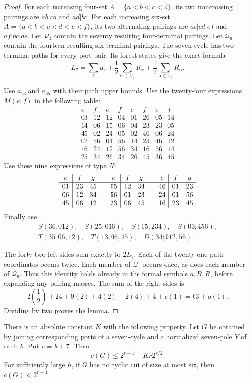 \begin{proof}
For each increasing four-set $A=\{a<b<c<d\}$, its two noncrossing pairings are $ab|cd$ and $ad|bc$.
For each increasing six-set $A=\{a<b<c<d<e<f\}$, its two alternating pairings are $ab|cd|ef$ and $af|bc|de$.
Let $\mathcal Q_4$ contain the seventy resulting four-terminal pairings.
Let $\mathcal Q_6$ contain the fourteen resulting six-terminal pairings.
The seven-cycle has two terminal paths for every port pair.
Its forest states give the exact formula
\[
 L_7=\sum_e a_e+\frac12\sum_{\alpha\in\mathcal Q_4}B_\alpha
                     +\frac12\sum_{\alpha\in\mathcal Q_6}R_\alpha.
\]

Use $a_{13}$ and $a_{35}$ with their path upper bounds.
Use the twenty-four expressions $M(e;f)$ in the following table:
\[
\begin{array}{cc|cc|cc|cc}
e&f&e&f&e&f&e&f\\\hline
03&12&12&04&01&26&05&14\\
14&06&15&06&04&23&23&05\\
45&02&24&05&02&46&06&24\\
02&56&04&56&14&23&46&12\\
16&24&12&56&34&16&56&14\\
25&34&26&34&26&45&36&45
\end{array}
\]
Use these nine expressions of type $N$:
\[
\begin{array}{c|cc@{\qquad}c|cc@{\qquad}c|cc}
e&f&g&e&f&g&e&f&g\\\hline
01&23&45&05&12&34&46&01&23\\
06&12&34&56&01&23&24&01&56\\
45&06&12&23&06&45&16&23&45
\end{array}
\]
Finally use
\[
\begin{gathered}
 S(36;012),\quad S(25;016),\quad S(15;234),\quad S(03;456),\\
 T(35;06,12),\quad T(13;06,45),\quad D(34;012,56).
\end{gathered}
\]

The forty-two left sides sum exactly to $2L_7$.
Each of the twenty-one path coordinates occurs twice.
Each member of $\mathcal Q_4$ occurs once, as does each member of $\mathcal Q_6$.
Thus this identity holds already in the formal symbols $a,B,R$, before expanding any pairing masses.
The sum of the right sides is
\[
 2\left(\frac12\right)+24+9(2)+4(2)+2(4)+4+o(1)
 =63+o(1).
\]
Dividing by two proves the lemma.
\end{proof}

\begin{theorem}
\label{thm:random-seven-cycle-shore}
There is an absolute constant $K$ with the following property.
Let $G$ be obtained by joining corresponding ports of a seven-cycle and a normalized seven-pole $Y$ of rank $h$.
Put $r=h+7$.
Then
\[
 c(G)\le2^{r-1}+Kr2^{r/2}.
\]
For sufficiently large $h$, if $G$ has no cyclic cut of size at most six, then $c(G)<2^{r-1}$.
\end{theorem}

